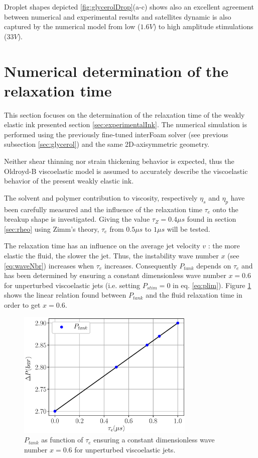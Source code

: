 \documentclass[twocolumn,10pt]{asme2ej}
\begin{document}
Droplet shapes depicted \ref{fig:glycerolDrop}(a-c) shows also an excellent agreement between numerical and experimental results and satellites dynamic is also captured by the numerical model from low ($1.6V$) to high amplitude stimulations ($33V$).


\section{Numerical determination of the relaxation time} \label{numericalDetermination}

This section focuses on the determination of the relaxation time of the weakly elastic ink presented section \ref{sec:experimentalInk}. The numerical simulation  is performed using the previously fine-tuned interFoam solver (see previous subsection \ref{sec:glycerol}) and the same 2D-axisymmetric geometry. 

Neither shear thinning nor strain thickening behavior is expected, thus the Oldroyd-B viscoelastic model \cite{oldroyd1950formulation} is assumed to accurately describe the viscoelastic behavior of the present weakly elastic ink. 

The solvent and polymer contribution to viscosity, respectively $\eta_s$ and $\eta_p$ have been carefully measured and the influence of the relaxation time $\tau_e$ onto the breakup shape is investigated. Giving the value $\tau_Z= 0.4 \mu s$ found in section  \ref{sec:rheo} using Zimm's theory, $\tau_e$ from $0.5 \mu s$ to $1 \mu s$ will be tested. 

The relaxation time has an influence on the average jet velocity $v$ : the more elastic the fluid, the slower the jet. Thus, the instability wave number $x$ (see \ref{eq:waveNbr}) increases when $\tau_e$ increases. Consequently $P_{tank}$ depends on $\tau_e$ and has been determined by ensuring a constant dimensionless wave number $x=0.6$ for unperturbed viscoelastic jets (i.e. setting $P_{stim}=0$ in eq. \ref{eq:plim}). Figure \ref{fig:dP} shows the linear relation found between $P_{tank}$ and the fluid relaxation time in order to get $x=0.6$.

\begin{figure}[H]
    \centering
    \includegraphics[width=8.5cm]{dP.eps}
    \caption{$P_{tank}$ as function of $\tau_e$ ensuring a constant dimensionless wave number $x = 0.6$ for unperturbed viscoelastic jets.}
    \label{fig:dP}
\end{figure}
\end{document}
